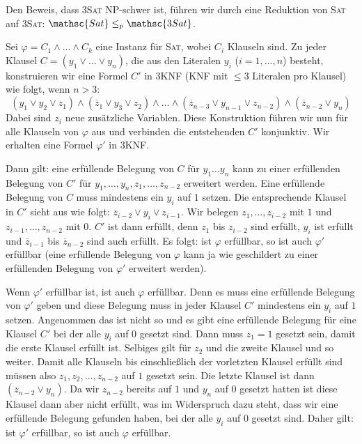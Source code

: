 \begin{Bew}
  \hspace{\parindent}Den Beweis, dass \textsc{3Sat} \textsf{NP}-schwer ist, führen wir durch eine Reduktion von \textsc{Sat} auf \textsc{3Sat}: $\mathsc{Sat} \le_p \mathsc{3Sat}$.
  
  Sei $\varphi=C_1 \wedge \ldots \wedge C_k$ eine Instanz für \textsc{Sat}, wobei $C_i$ Klauseln sind. Zu jeder Klausel $C=(y_1 \vee \ldots \vee y_n)$, die aus den Literalen $y_i$ ($i=1, \ldots, n$) besteht, konstruieren wir eine Formel $C'$ in 3KNF (KNF mit $\le 3$ Literalen pro Klausel) wie folgt, wenn $n > 3$:
  \[ (y_1 \vee y_2 \vee z_1) \wedge (\overline{z}_1 \vee y_3 \vee z_2) \wedge \ldots \wedge (\overline{z}_{n-3} \vee y_{n-1} \vee z_{n-2}) \wedge (\overline{z}_{n-2} \vee y_n) \]
  Dabei sind $z_i$ neue zusätzliche Variablen. Diese Konstruktion führen wir nun für alle Klauseln von $\varphi$ aus und verbinden die entstehenden $C'$ konjunktiv. Wir erhalten eine Formel $\varphi'$ in 3KNF.
  
  Dann gilt: eine erfüllende Belegung von $C$ für $y_1 \ldots y_n$ kann zu einer erfüllenden Belegung von $C'$ für $y_1, \ldots, y_n, z_1, \ldots, z_{n-2}$ erweitert werden. Eine erfüllende Belegung von $C$ muss mindestens ein $y_i$ auf $1$ setzen. Die entsprechende Klausel in $C'$ sieht aus wie folgt: $\overline{z}_{i-2} \vee y_i \vee z_{i-1}$. Wir belegen $z_1, \ldots, z_{i-2}$ mit $1$ und $z_{i-1}, \ldots, z_{n-2}$ mit $0$. $C'$ ist dann erfüllt, denn $z_1$ bis $z_{i-2}$ sind erfüllt, $y_i$ ist erfüllt und $\overline{z}_{i-1}$ bis $\overline{z}_{n-2}$ sind auch erfüllt. Es folgt: ist $\varphi$ erfüllbar, so ist auch $\varphi'$ erfüllbar (eine erfüllende Belegung von $\varphi$ kann ja wie geschildert zu einer erfüllenden Belegung von $\varphi'$ erweitert werden).
  
  Wenn $\varphi'$ erfüllbar ist, ist auch $\varphi$ erfüllbar. Denn es muss eine erfüllende Belegung von $\varphi'$ geben und diese Belegung muss in jeder Klausel $C'$ mindestens ein $y_i$ auf $1$ setzen. Angenommen das ist nicht so und es gibt eine erfüllende Belegung für eine Klausel $C'$ bei der alle $y_i$ auf $0$ gesetzt sind. Dann muss $z_1 = 1$ gesetzt sein, damit die erste Klausel erfüllt ist. Selbiges gilt für $z_2$ und die zweite Klausel und so weiter. Damit alle Klauseln bis einschließlich der vorletzten Klausel erfüllt sind müssen also $z_1, z_2, \ldots, z_{n-2}$ auf $1$ gesetzt sein. Die letzte Klausel ist dann $(\overline{z}_{n-2} \vee y_n)$. Da wir $z_{n-2}$ bereits auf $1$ und $y_n$ auf $0$ gesetzt hatten ist diese Klausel dann aber nicht erfüllt, was im Widerspruch dazu steht, dass wir eine erfüllende Belegung gefunden haben, bei der alle $y_i$ auf $0$ gesetzt sind. Daher gilt: ist $\varphi'$ erfüllbar, so ist auch $\varphi$ erfüllbar.
\end{Bew}

